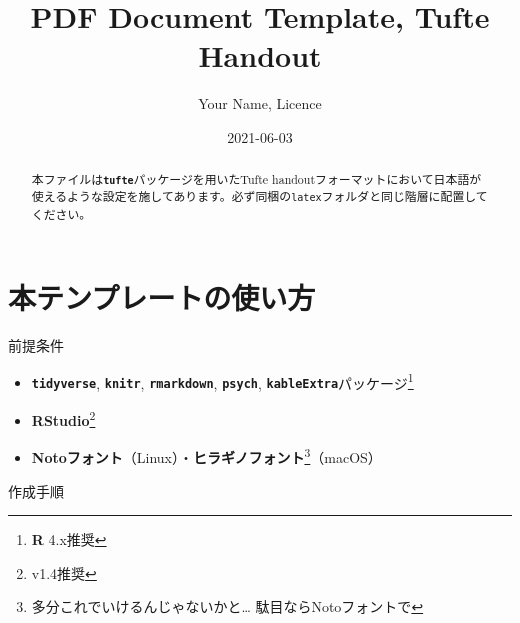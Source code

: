 \documentclass[a4paper,14pt]{tufte-handout}
\title[Tufte Handout with R Markdown]{PDF Document Template, Tufte
Handout}
\author{Your Name, Licence}
\date{2021-06-03}
\providecommand{\tightlist}{%
  \setlength{\itemsep}{0pt}\setlength{\parskip}{0pt}}
\begin{document}
\maketitle

\begin{abstract}
\noindent 本ファイルは\textbf{\texttt{tufte}}パッケージを用いたTufte
handoutフォーマットにおいて日本語が使えるような設定を施してあります。必ず同梱の\texttt{latex}フォルダと同じ階層に配置してください。
\end{abstract}



\hypertarget{ux672cux30c6ux30f3ux30d7ux30ecux30fcux30c8ux306eux4f7fux3044ux65b9}{%
\section{本テンプレートの使い方}\label{ux672cux30c6ux30f3ux30d7ux30ecux30fcux30c8ux306eux4f7fux3044ux65b9}}

前提条件

\begin{itemize}
\tightlist
\item
  \textbf{\texttt{tidyverse}}\citep{R-tidyverse},
  \textbf{\texttt{knitr}}\citep{knitr2014, R-knitr},
  \textbf{\texttt{rmarkdown}}\citep{R-rmarkdown},
  \textbf{\texttt{psych}}\citep{R-psych},
  \textbf{\texttt{kableExtra}}\citep{R-kableExtra}パッケージ\footnote{\textbf{R}
    4.x推奨}
\item
  \textbf{RStudio}\footnote{v1.4推奨}
\item
  \textbf{Notoフォント}（Linux）・\textbf{ヒラギノフォント}\footnote{多分これでいけるんじゃないかと\ldots{}
    駄目ならNotoフォントで}（macOS）
\end{itemize}

作成手順
\end{document}
